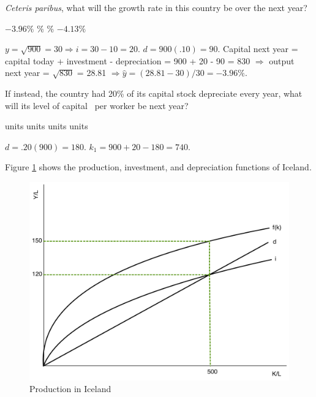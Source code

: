 \documentclass[addpoints,11pt]{exam}
\theoremstyle{definition}
\begin{document}
\begin{questions}
	
	
	\question \label{blah1} \textit{Ceteris paribus}, what will the growth rate in this country be over the next year?
	
	\begin{choices}
		\CorrectChoice $-3.96\%$
		\%
		\%
		\choice $-4.13\%$
	\end{choices}
	
	\begin{solution}
		$y = \sqrt{900} = 30 \Rightarrow i = 30 - 10 = 20$. $d = 900(.10) = 90$. Capital next year = capital today + investment - depreciation = 900 + 20 - 90 = 830 $\Rightarrow$ output next year = $\sqrt{830}$ = 28.81 $\Rightarrow \hat{y} = (28.81 - 30)/30 = -3.96\%$.
	\end{solution}
	
\newpage
	
	\question \label{blah2} If instead, the country had 20\% of its capital stock depreciate every year, what will its level of capital \ per worker be next year?
	
	\begin{choices}
		 units
		 units
		 units
		 units
	\end{choices}
	
	\begin{solution}
		$d = .20(900) = 180$. $k_{1} = 900 + 20 - 180 = 740$.
	\end{solution}
	
	
	
	\question Figure \ref{MC30} shows the production, investment, and depreciation functions of Iceland.
	
	\begin{figure}[H]
		\centering
		\includegraphics[scale=.40]{Exam2_MC30.pdf}
		\caption{Production in Iceland}
		\label{MC30}
	\end{figure}
	

\end{questions}
\end{document}
